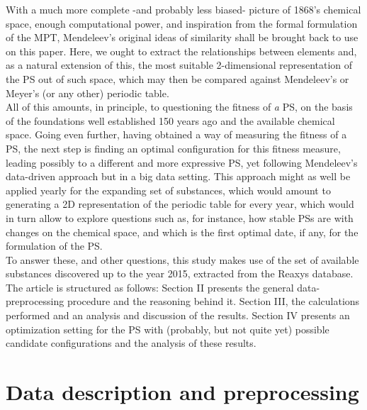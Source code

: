 \documentclass[article]{article}
\begin{document}
With a much more complete -and probably less biased- picture of 1868's chemical space, enough computational power, and inspiration from the formal formulation of the MPT, Mendeleev's original ideas of similarity shall be brought back to use on this paper. Here, we ought to extract the relationships between elements and, as a natural extension of this, the most suitable 2-dimensional representation of the PS out of such space, which may then be compared against Mendeleev's or Meyer's (or any other) periodic table. \\

All of this amounts, in principle, to questioning the fitness of \textit{a} PS, on the basis of the foundations well established 150 years ago and the available chemical space. Going even further, having obtained a way of measuring the fitness of a PS, the next step is finding an optimal configuration for this fitness measure, leading possibly to a different and more expressive PS, yet following Mendeleev's data-driven approach but in a big data setting. This approach might as well be applied yearly for the expanding set of substances, which would amount to generating a 2D representation of the periodic table for every year, which would in turn allow to explore questions such as, for instance, how stable PSs are with changes on the chemical space, and which is the first optimal date, if any, for the formulation of the PS.\\

To answer these, and other questions, this study makes use of the set of available substances discovered up to the year 2015, extracted from the Reaxys database. The article is structured as follows: Section II presents the general data-preprocessing procedure and the reasoning behind it. Section III, the calculations performed and an analysis and discussion of the results. Section IV presents an optimization setting for the PS with (probably, but not quite yet) possible candidate configurations and the analysis of these results.\\


\section{Data description and preprocessing}
\label{sec:sec2}
\end{document}
